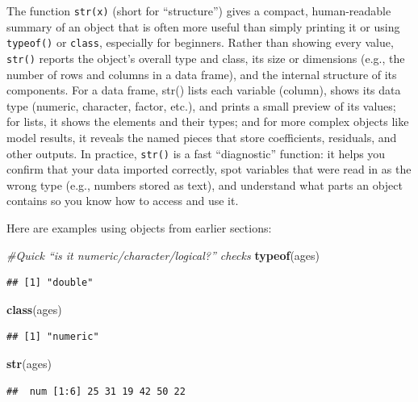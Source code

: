 \documentclass[
  11pt,
]{article}
\newenvironment{Shaded}{\begin{snugshade}}{\end{snugshade}}
\newcommand{\CommentTok}[1]{\textcolor[rgb]{0.56,0.35,0.01}{\textit{#1}}}
\newcommand{\FunctionTok}[1]{\textcolor[rgb]{0.13,0.29,0.53}{\textbf{#1}}}
\newcommand{\NormalTok}[1]{#1}
\begin{document}
The function \texttt{str(x)} (short for ``structure'') gives a compact,
human-readable summary of an object that is often more useful than
simply printing it or using \texttt{typeof()} or \texttt{class},
especially for beginners. Rather than showing every value,
\texttt{str()} reports the object's overall type and class, its size or
dimensions (e.g., the number of rows and columns in a data frame), and
the internal structure of its components. For a data frame, str() lists
each variable (column), shows its data type (numeric, character, factor,
etc.), and prints a small preview of its values; for lists, it shows the
elements and their types; and for more complex objects like model
results, it reveals the named pieces that store coefficients, residuals,
and other outputs. In practice, \texttt{str()} is a fast ``diagnostic''
function: it helps you confirm that your data imported correctly, spot
variables that were read in as the wrong type (e.g., numbers stored as
text), and understand what parts an object contains so you know how to
access and use it.

Here are examples using objects from earlier sections:

\begin{Shaded}
\begin{Highlighting}[]
\CommentTok{\#Quick “is it numeric/character/logical?” checks}
\FunctionTok{typeof}\NormalTok{(ages)}
\end{Highlighting}
\end{Shaded}

\begin{verbatim}
## [1] "double"
\end{verbatim}

\begin{Shaded}
\begin{Highlighting}[]
\FunctionTok{class}\NormalTok{(ages)}
\end{Highlighting}
\end{Shaded}

\begin{verbatim}
## [1] "numeric"
\end{verbatim}

\begin{Shaded}
\begin{Highlighting}[]
\FunctionTok{str}\NormalTok{(ages)}
\end{Highlighting}
\end{Shaded}

\begin{verbatim}
##  num [1:6] 25 31 19 42 50 22
\end{verbatim}
\end{document}
